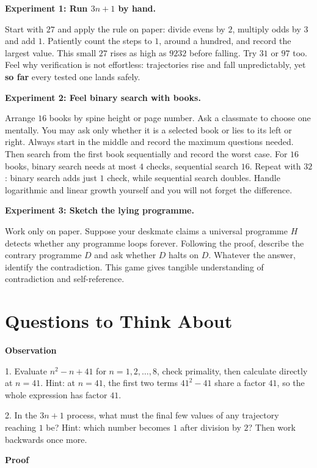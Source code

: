 \begin{shiyan}
\textbf{Experiment 1: Run $3n+1$ by hand.}

Start with $27$ and apply the rule on paper: divide evens by $2$, multiply odds by $3$ and add $1$. Patiently count the steps to $1$, around a hundred, and record the largest value. This small $27$ rises as high as $9232$ before falling. Try $31$ or $97$ too. Feel why verification is not effortless: trajectories rise and fall unpredictably, yet \textbf{so far} every tested one lands safely.

\textbf{Experiment 2: Feel binary search with books.}

Arrange $16$ books by spine height or page number. Ask a classmate to choose one mentally. You may ask only whether it is a selected book or lies to its left or right. Always start in the middle and record the maximum questions needed. Then search from the first book sequentially and record the worst case. For $16$ books, binary search needs at most $4$ checks, sequential search $16$. Repeat with $32$: binary search adds just $1$ check, while sequential search doubles. Handle logarithmic and linear growth yourself and you will not forget the difference.

\textbf{Experiment 3: Sketch the lying programme.}

Work only on paper. Suppose your deskmate claims a universal programme $H$ detects whether any programme loops forever. Following the proof, describe the contrary programme $D$ and ask whether $D$ halts on $D$. Whatever the answer, identify the contradiction. This game gives tangible understanding of contradiction and self-reference.
\end{shiyan}

\section*{Questions to Think About}

\textbf{Observation}

1. Evaluate $n^2 - n + 41$ for $n=1,2,\dots,8$, check primality, then calculate directly at $n=41$. Hint: at $n=41$, the first two terms $41^2-41$ share a factor $41$, so the whole expression has factor $41$.

2. In the $3n+1$ process, what must the final few values of any trajectory reaching $1$ be? Hint: which number becomes $1$ after division by $2$? Then work backwards once more.

\textbf{Proof}

